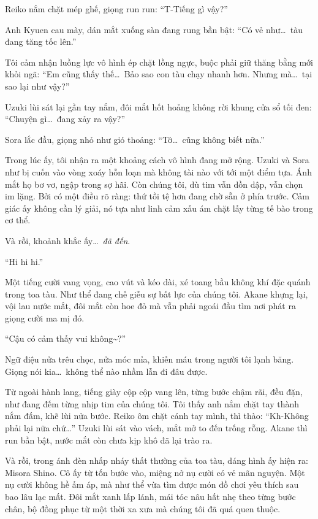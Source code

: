 \documentclass[../main.tex]{subfiles}
\begin{document}
Reiko nắm chặt mép ghế, giọng run run: ``T-Tiếng gì vậy?''

Anh Kyuen cau mày, dán mắt xuống sàn đang rung bần bật: ``Có vẻ như\dots\ tàu đang tăng tốc lên.''

Tôi cảm nhận luồng lực vô hình ép chặt lồng ngực, buộc phải giữ thăng bằng mới khỏi ngã: ``Em cũng thấy thế\dots\ Bảo sao con tàu chạy nhanh hơn. Nhưng mà\dots\ tại sao lại như vậy?''

Uzuki lùi sát lại gần tay nắm, đôi mắt hốt hoảng không rời khung cửa sổ tối đen: ``Chuyện gì\dots\ đang xảy ra vậy?''

Sora lắc đầu, giọng nhỏ như gió thoảng: ``Tớ\dots\ cũng không biết nữa.''

Trong lúc ấy, tôi nhận ra một khoảng cách vô hình đang mở rộng. Uzuki và Sora như bị cuốn vào vòng xoáy hỗn loạn mà không tài nào với tới một điểm tựa. Ánh mắt họ bơ vơ, ngập trong sợ hãi. Còn chúng tôi, dù tim vẫn dồn dập, vẫn chọn im lặng. Bởi có một điều rõ ràng: thứ tồi tệ hơn đang chờ sẵn ở phía trước. Cảm giác ấy không cần lý giải, nó tựa như linh cảm xấu ám chặt lấy từng tế bào trong cơ thể.

Và rồi, khoảnh khắc ấy\dots\ \emph{đã đến}.

``Hi hi hi.''

Một tiếng cười vang vọng, cao vút và kéo dài, xé toang bầu không khí đặc quánh trong toa tàu. Như thể đang chế giễu sự bất lực của chúng tôi. Akane khựng lại, vội lau nước mắt, đôi mắt còn hoe đỏ mà vẫn phải ngoái đầu tìm nơi phát ra giọng cười ma mị đó.


``Cậu có cảm thấy vui không\~{}?''

Ngữ điệu nửa trêu chọc, nửa móc mỉa, khiến máu trong người tôi lạnh băng. Giọng nói kia\dots\ không thể nào nhầm lẫn đi đâu được.

Từ ngoài hành lang, tiếng giày cộp cộp vang lên, từng bước chậm rãi, đều đặn, như đang đếm từng nhịp tim của chúng tôi. Tôi thấy anh nắm chặt tay thành nắm đấm, khẽ lùi nửa bước. Reiko ôm chặt cánh tay mình, thì thào: ``Kh-Không phải lại nữa chứ\dots'' Uzuki lùi sát vào vách, mắt mở to đến trống rỗng. Akane thì run bần bật, nước mắt còn chưa kịp khô đã lại trào ra.

Và rồi, trong ánh đèn nhấp nháy thất thường của toa tàu, dáng hình ấy hiện ra: Misora Shino. Cô ấy từ tốn bước vào, miệng nở nụ cười có vẻ mãn nguyện. Một nụ cười không hề ấm áp, mà như thể vừa tìm được món đồ chơi yêu thích sau bao lâu lạc mất. Đôi mắt xanh lấp lánh, mái tóc nâu hất nhẹ theo từng bước chân, bộ đồng phục từ một thời xa xưa mà chúng tôi đã quá quen thuộc.
\end{document}
